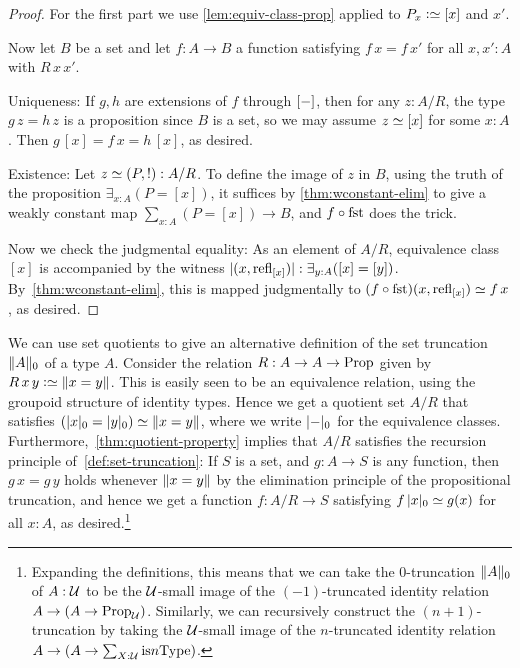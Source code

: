 \begin{proof}
  For the first part we use \cref{lem:equiv-class-prop} applied to $P_x \defeq [x]$ and $x'$.

  Now let $B$ be a set and let $f : A \to B$ a function satisfying $f\,x=f\,x'$
  for all $x,x':A$ with $R\,x\,x'$.

  Uniqueness: If $g,h$ are extensions of $f$ through $[{-}]$, then
  for any $z:A/R$, the type $g\,z=h\,z$ is a proposition since $B$ is
  a set, so we may assume $z\jdeq [x]$ for some $x:A$. Then
  $g\,[x] = f\,x = h\,[x]$, as desired.

  Existence: Let $z\jdeq(P,!):A/R$. To define the image of $z$ in $B$,
  using the truth of the proposition $\exists_{x:A}(P = [x])$,
  it suffices by \cref{thm:wconstant-elim}
  to give a weakly constant map $\sum_{x:A}(P = [x]) \to B$,
  and $f \circ \fst$ does the trick.

  Now we check the judgmental equality: As an element of $A/R$,
  equivalence class $[x]$ is accompanied by the witness
  $\trunc{(x, \refl{[x]})} : \exists_{y:A}([x] = [y])$.
  By~\cref{thm:wconstant-elim}, this is mapped judgmentally
  to $(f \circ \fst)(x, \refl{[x]}) \jdeq f\,x$, as desired.
\end{proof}

We can use set quotients to give an alternative definition
of the set truncation $\lVert A\rVert_0$ of a type $A$.
Consider the relation $R : A \to A \to \mathrm{Prop}$ given by
$R\,x\,y \defeq \Trunc{x=y}$.
This is easily seen to be an equivalence relation,
using the groupoid structure of identity types.
Hence we get a quotient set $A/R$ that satisfies
$(\lvert x\rvert_0 = \lvert y\rvert_0) \simeq \lVert x=y\rVert$,
where we write $\lvert{-}\rvert_0$ for the equivalence classes.
Furthermore,~\cref{thm:quotient-property} implies that
$A/R$ satisfies the recursion principle of~\cref{def:set-truncation}:
If $S$ is a set, and $g:A\to S$ is any function,
then $g\,x=g\,y$ holds whenever $\lVert x=y\rVert$
by the elimination principle
of the propositional truncation,
and hence we get a function $f : A/R \to S$ satisfying
$f\,\trunc{x}_0\jdeq g(x)$ for all $x:A$, as desired.\footnote{%
  Expanding the definitions,
  this means that we can take the $0$-truncation $\lVert A\rVert_0$
  of $A:{\mathcal{U}}$ to be the ${\mathcal{U}}$-small image
  of the $(-1)$-truncated identity relation
  $A \to (A \to \mathrm{Prop}_{\mathcal{U}})$.
  Similarly, we can recursively construct the $(n+1)$-truncation
  by taking the ${\mathcal{U}}$-small image
  of the $n$-truncated identity relation
  $A \to (A \to \sum_{X:{\mathcal{U}}}\mathrm{is}{n}\mathrm{Type})$.}


